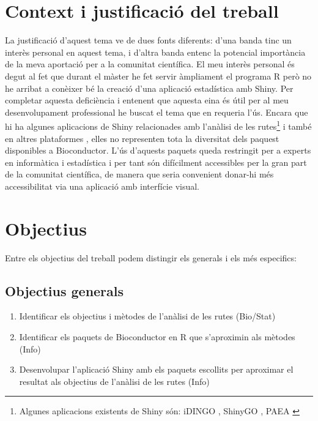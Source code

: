 \section{Context i justificació del treball}
La justificació d'aquest tema ve de dues fonts diferents: d'una banda tinc un interès personal en aquest tema, i d'altra banda entenc la potencial importància de la meva aportació per a la comunitat científica. El meu interès personal és degut al fet que durant el màster he fet servir àmpliament el programa R però no he arribat a conèixer bé la creació d'una aplicació estadística amb Shiny. Per completar aquesta deficiència i entenent que aquesta eina és útil per al meu desenvolupament professional he buscat el tema que en requeria l'ús. Encara que hi ha algunes aplicacions de Shiny relacionades amb l'anàlisi de les rutes\footnote{Algunes aplicacions existents de Shiny són: iDINGO \cite{class2017idingo}, ShinyGO \cite{ge2018shinygo}, PAEA \cite{clark2015principle}} i també en altres plataformes \cite{reimand2019pathway}, elles no representen tota la diversitat dels paquest disponibles a \gls{Bioconductor}. L'ús d'aquests paquets queda restringit per a experts en informàtica i estadística i per tant són difícilment accessibles per la gran part de la comunitat científica, de manera que seria convenient donar-hi més accessibilitat via una aplicació amb interfície visual. 


\section{Objectius}

Entre els objectius del treball podem distingir els generals i els més especifics:
\subsection{Objectius generals}
\begin{enumerate}
\item Identificar els objectius i mètodes de l'anàlisi de les rutes (Bio/Stat)
\item Identificar els paquets de \gls{Bioconductor} en R que s'aproximin als mètodes (Info)
\item Desenvolupar l'aplicació Shiny amb els paquets escollits per aproximar el resultat als objectius de l'anàlisi de les rutes (Info)
\end{enumerate}

